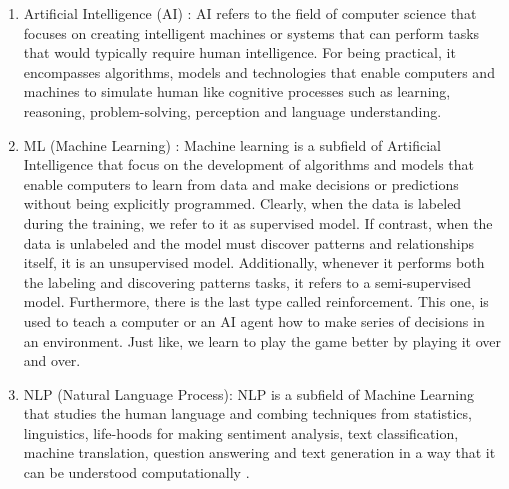 \documentclass[12pt,a4paper, oneside]{book}
\begin{document}
\begin{enumerate}[label=\alph*)]
		\item Artificial Intelligence (AI) :
		 AI refers to the field of computer science that focuses on creating intelligent machines or systems that can perform tasks that would typically require human intelligence. For being practical, it encompasses algorithms, models and technologies that enable computers and machines to simulate human like cognitive processes such as learning, reasoning, problem-solving, perception and language understanding.  
		 
		 \item ML (Machine Learning)  : 
		 Machine learning is a subfield of Artificial Intelligence that focus on the development of algorithms and models that enable computers to learn from data and make decisions or predictions without being explicitly programmed\cite{smola2010introduction}. Clearly, when the data is labeled during the training, we refer to it as supervised model. If contrast, when the data is unlabeled and the model must discover patterns and relationships itself, it is an unsupervised model. Additionally, whenever it performs both the labeling  and discovering patterns tasks, it refers to a semi-supervised model. Furthermore, there is the last type called reinforcement. This one, is used to teach a computer or an AI agent how to make series of decisions in an environment. Just like, we learn to play the game better by playing it over and over.   
		 
		 \item NLP (Natural Language Process):
		 NLP is a subfield of Machine Learning that studies the human language and combing techniques from statistics, linguistics, life-hoods for making sentiment analysis, text classification, machine translation, question answering and text generation in a way that it can be understood computationally \cite{cambria2014jumping}. 
		  \end{enumerate}
\end{document}
